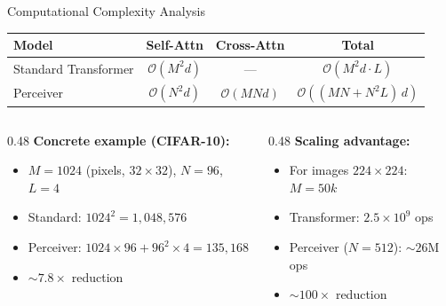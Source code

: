 \documentclass[aspectratio=169,11pt]{beamer}
\begin{document}
\begin{frame}{Computational Complexity Analysis}
  \begin{table}
    \centering\small
    \begin{tabular}{lccc}
      \toprule
      \textbf{Model} & \textbf{Self-Attn} & \textbf{Cross-Attn} & \textbf{Total} \\
      \midrule
      Standard Transformer & $\mathcal{O}(M^2 d)$ & --- & $\mathcal{O}(M^2 d \cdot L)$ \\
      \midrule
      Perceiver & $\mathcal{O}(N^2 d)$ & $\mathcal{O}(MNd)$ & $\mathcal{O}((MN + N^2 L)\,d)$ \\
      \bottomrule
    \end{tabular}
  \end{table}

  \vspace{0.5em}
  \begin{columns}[T]
    \begin{column}{0.48\textwidth}
      \textbf{Concrete example (CIFAR-10):}
      \begin{itemize}
        \item $M = 1024$ (pixels, $32{\times}32$), $N = 96$, $L = 4$
        \item Standard: $1024^2 = 1{,}048{,}576$
        \item Perceiver: $1024 \times 96 + 96^2 \times 4 = 135{,}168$
        \item \alert{$\sim\!7.8\times$ reduction}
      \end{itemize}
    \end{column}
    \begin{column}{0.48\textwidth}
      \textbf{Scaling advantage:}
      \begin{itemize}
        \item For images $224\!\times\!224$: $M\!=\!50k$
        \item Transformer: $2.5 \times 10^9$ ops
        \item Perceiver ($N\!=\!512$): $\sim\!26$M ops
        \item \alert{$\sim\!100\times$ reduction}
      \end{itemize}
    \end{column}
  \end{columns}
\end{frame}
\end{document}
